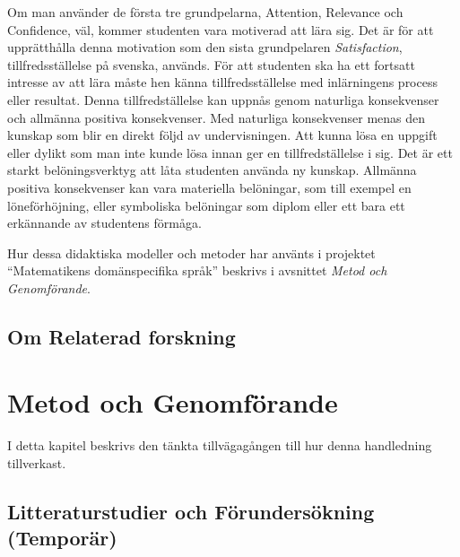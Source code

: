 \documentclass[]{article}
\begin{document}
Om man använder de första tre grundpelarna, Attention, Relevance och Confidence,
väl, kommer studenten vara motiverad att lära sig.
Det är för att upprätthålla denna motivation som den sista grundpelaren
\textit{Satisfaction}, tillfredsställelse på svenska, används.
För att studenten ska ha ett fortsatt intresse av att lära måste hen känna
tillfredsställelse med inlärningens process eller resultat.
Denna tillfredställelse kan uppnås genom naturliga konsekvenser och allmänna positiva
konsekvenser. Med naturliga konsekvenser menas den kunskap som blir
en direkt följd av undervisningen. Att kunna lösa en uppgift eller dylikt
som man inte kunde lösa innan ger en tillfredställelse i sig.
Det är ett starkt belöningsverktyg att låta studenten använda ny kunskap.
Allmänna positiva konsekvenser kan vara materiella belöningar,
som till exempel en löneförhöjning, eller symboliska belöningar som diplom
eller ett bara ett erkännande av studentens förmåga.

Hur dessa didaktiska modeller och metoder har använts i projektet
``Matematikens domänspecifika språk'' beskrivs i avsnittet
\textit{Metod och Genomförande}.

\subsection{Om Relaterad forskning}

\section{Metod och Genomförande}



I detta kapitel beskrivs den tänkta tillvägagången till hur denna
handledning tillverkast.

\subsection{Litteraturstudier och Förundersökning (Temporär)}

\end{document}
